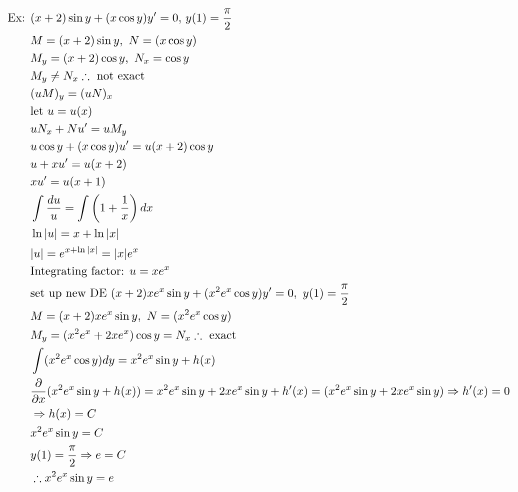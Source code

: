 \documentclass[11pt, fleqn]{article}
\begin{document}
\begin{align*}
    \text{Ex: }&(x+2)\sin y+(x\cos y)y'=0,\,y(1)=\frac{\pi}{2}\\
    &M=(x+2)\sin y,\ N=(x\cos y)\\
    &M_y=(x+2)\cos y,\ N_x=\cos y\\
    &M_y\neq N_x\therefore \text{ not exact}\\
    &(uM)_y=(uN)_x\\
    &\text{let }u=u(x)\\
    &uN_x+Nu'=uM_y\\
    &u\cos y+(x\cos y)u'=u(x+2)\cos y\\
    &u+xu'=u(x+2)\\
    &xu'=u(x+1)\\
    &\int\frac{du}{u}=\int\brround{1+\frac{1}{x}}dx\\
    &\ln|u|=x+\ln|x|\\
    &|u|=e^{x+\ln|x|}=|x|e^x\\
    &\text{Integrating factor: }u=xe^x\\
    &\text{set up new DE }(x+2)xe^x\sin y+(x^2e^x\cos y)y'=0,\ y(1)=\frac{\pi}{2}\\
    &M=(x+2)xe^x\sin y,\ N=(x^2e^x\cos y)\\
    &M_y=(x^2e^x+2xe^x)\cos y=N_x\therefore \text{ exact}\\
    &\int(x^2e^x\cos y)dy=x^2e^x\sin y+h(x)\\
    &\frac{\partial}{\partial x}(x^2e^x\sin y+h(x))=x^2e^x\sin y+2xe^x\sin y+h'(x)=(x^2e^x\sin y+2xe^x\sin y)\Ra h'(x)=0\\
    &\Ra h(x)=C\\
    &x^2e^x\sin y=C\\
    &y(1)=\frac{\pi}{2}\Ra e=C\\
    &\therefore x^2e^x\sin y=e
\end{align*}
\end{document}
